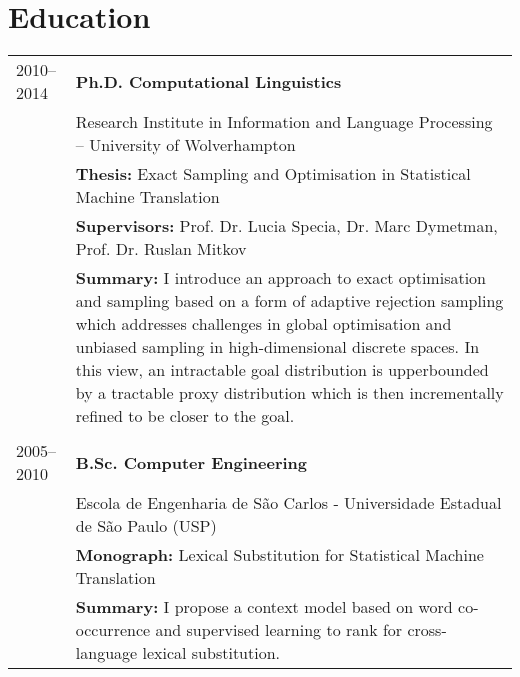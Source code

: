 \section*{Education}

\begin{tabular}{p{2cm}  p{13.92cm}}
2010--2014 & \bf Ph.D. Computational Linguistics  \\
 & Research Institute in Information and Language Processing – University of Wolverhampton \\
 & {\bf Thesis:} Exact Sampling and Optimisation in Statistical Machine Translation \\
 & {\bf Supervisors:} Prof. Dr. Lucia Specia, Dr. Marc Dymetman, Prof. Dr. Ruslan Mitkov \\
 & {\bf Summary:} I introduce an approach to exact optimisation and sampling based on a form of adaptive rejection sampling which addresses challenges in global optimisation and unbiased sampling in high-dimensional discrete spaces. In this view, an intractable goal distribution is upperbounded by a tractable proxy distribution which is then incrementally refined to be closer to the goal. \\ %
 & \\
2005--2010 	& \bf B.Sc. Computer Engineering  \\ %
 & Escola de Engenharia de S\~ao Carlos - Universidade Estadual de S\~ao Paulo (USP) \\
 & {\bf Monograph:} Lexical Substitution for Statistical Machine Translation \\
 & {\bf Summary:} I propose a context model based on word co-occurrence and supervised learning to rank for cross-language lexical substitution. %
\end{tabular}

